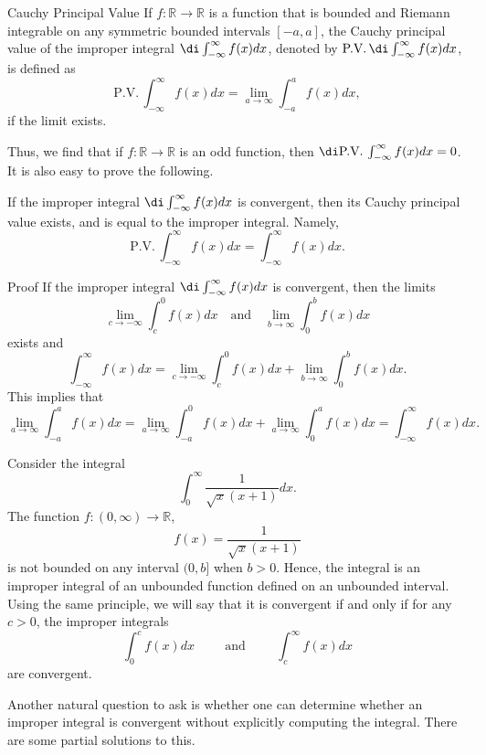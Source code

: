 \begin{example}[label=20230527]{}
\begin{definition}{Cauchy Principal Value}
If $f:\mathbb{R}\to\mathbb{R}$ is a function that is bounded and Riemann integrable on any symmetric bounded intervals $[-a,a]$, the Cauchy principal value of the improper integral $\di\int_{-\infty}^{\infty}f(x)dx$, denoted by $\text{P.V.}\, \di\int_{-\infty}^{\infty}f(x)dx$, is defined as
\[\text{P.V.}\,\int_{-\infty}^{\infty}f(x)dx=\lim_{a\to \infty}\int_{-a}^af(x)dx,\]
if the limit exists.
\end{definition}  
Thus, we find that if $f:\mathbb{R}\to\mathbb{R}$ is an odd function, then $\di\text{P.V.}\,\int_{-\infty}^{\infty}f(x)dx=0$. It is also easy to prove the following.

\begin{proposition}[label=230224_10]{} If the improper integral  $\di\int_{-\infty}^{\infty}f(x)dx$ is convergent, then 
its Cauchy principal value exists, and is equal to the improper integral. Namely, 
\[\text{P.V.}\,  \int_{-\infty}^{\infty}f(x)dx=  \int_{-\infty}^{\infty}f(x)dx.\]
\end{proposition}
\begin{myproof}{Proof}
If  the improper integral $\di \int_{-\infty}^{\infty}f(x)dx$ is convergent, then  the limits
\[\lim_{  c\to-\infty } \int_c^0f(x)dx\quad\text{and}\quad\lim_{b\to\infty}\int_0^bf(x)dx\]exists and
\[ \int_{-\infty}^{\infty}f(x)dx=\lim_{  c\to-\infty } \int_c^0f(x)dx+\lim_{b\to\infty}\int_0^bf(x)dx. \] This implies that 
\[ \lim_{a\to \infty} \int_{-a}^af(x)dx=
\lim_{a\to\infty}\int_{-a}^0f(x)dx+\lim_{a\to\infty}\int_0^af(x)dx=\int_{-\infty}^{\infty}f(x)dx.\] 
\end{myproof}


Consider the integral
\begin{equation}\label{eq230224_4}\int_0^{\infty}\frac{1}{\sqrt{x}(x+1)}dx.\end{equation}
The function $f:(0,\infty)\to\mathbb{R}$,
\[f(x)=\frac{1}{\sqrt{x}(x+1)}\] is not bounded on any interval $(0, b]$ when $b>0$. Hence, the integral is an improper integral of an unbounded function defined on an unbounded interval. Using the same principle, we will say that it is convergent if and only if for any $c>0$,  the improper integrals 
\[\int_0^cf(x)dx\hspace{1cm}\text{and}\hspace{1cm}\int_c^{\infty}f(x)dx\] are convergent. 

Another natural question to ask is whether one can determine whether an improper integral is convergent without explicitly computing the integral. There are some partial solutions to this. 


\end{example}
